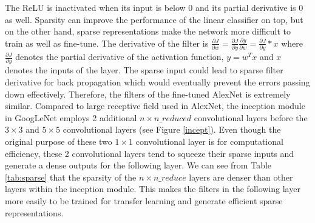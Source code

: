     The ReLU is inactivated when its input is below 0 and its partial derivative is 0 as well. Sparsity can improve the performance of the linear classifier on top, but on the other hand, sparse representations make the network more difficult to train as well as fine-tune. The derivative of the filter is $\frac{{\partial J}}{{\partial w}} = \frac{{\partial J}}{{\partial y}}\frac{{\partial y}}{{\partial w}} = \frac{{\partial J}}{{\partial y}}*x$ where $\frac{{\partial J}}{{\partial y}}$ denotes the partial derivative of the activation function, $y=w^Tx$ and $x$ denotes the inputs of the layer. The sparse input could lead to sparse filter derivative for back propagation which would eventually prevent the errors passing down effectively. Therefore, the filters of the fine-tuned AlexNet is extremely similar. Compared to large receptive field used in AlexNet, the inception module in GoogLeNet employs 2 additional $n\times n\_reduced$ convolutional layers before the $3\times 3$ and $5\times 5$ convolutional layers (see Figure \ref{incept}). Even though the original purpose of these two $1\times 1$ convolutional layer is for computational efficiency, these 2 convolutional layers tend to squeeze their sparse inputs and generate a dense outputs for the following layer. We can see from Table \ref{tab:sparse} that the sparsity of the $n\times n\_reduce$ layers are denser than other layers within the inception module. This makes the filters in the following layer more easily to be trained for transfer learning and generate efficient sparse representations.


